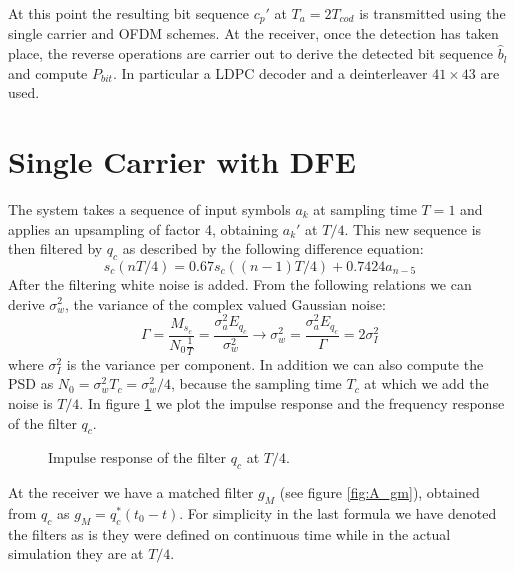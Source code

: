 \documentclass[a4paper,11.5pt]{article}
\begin{document}
At this point the resulting bit sequence $c_p'$ at $T_a = 2T_{cod}$ is transmitted using the single carrier and OFDM schemes. At the receiver, once the detection has taken place, the reverse operations are carrier out to derive the detected bit sequence $\hat{b}_l$ and compute $P_{bit}$. In particular a LDPC decoder and a deinterleaver $41\times 43$ are used.

\section*{Single Carrier with DFE}


The system takes a sequence of input symbols $a_k$ at sampling time $T=1$ and applies an upsampling of factor 4, obtaining $a_k'$ at $T/4$. This new sequence is then filtered by $q_c$ as described by the following difference equation:
\begin{equation}\label{eq:q_c}
s_c(nT/4) = 0.67 s_c((n-1)T/4) + 0.7424 a_{n-5}
\end{equation}
After the filtering white noise is added. From the following relations we can derive $\sigma_w^2$, the variance of the complex valued Gaussian noise:
\begin{equation}
\Gamma = \frac{M_{s_c}}{N_0\frac{1}{T}} = \frac{\sigma_a^2 E_{q_c}}{\sigma_w^2} \longrightarrow \sigma_w^2 = \frac{\sigma_a^2 E_{q_c}}{\Gamma} = 2\sigma_I^2
\end{equation}
where $\sigma_I^2$ is the variance per component. In addition we can also compute the PSD as $N_0=\sigma_w^2 T_c=\sigma_w^2/4$, because the sampling time $T_c$ at which we add the noise is $T/4$.
In figure \ref{fig:qc} we plot the impulse response and the frequency response of the filter $q_c$.

\begin{figure}[H]
	\begin{center}   
		\caption{Impulse response of the filter $q_c$ at $T/4$.}
		\label{fig:qc}
	\end{center}
\end{figure} 

At the receiver we have a matched filter $g_{M}$ (see figure \ref{fig:A_gm}), obtained from $q_c$ as $g_M=q_c^*(t_0-t)$. For simplicity in the last formula we have denoted the filters as is they were defined on continuous time while in the actual simulation they are at $T/4$. 
\end{document}
